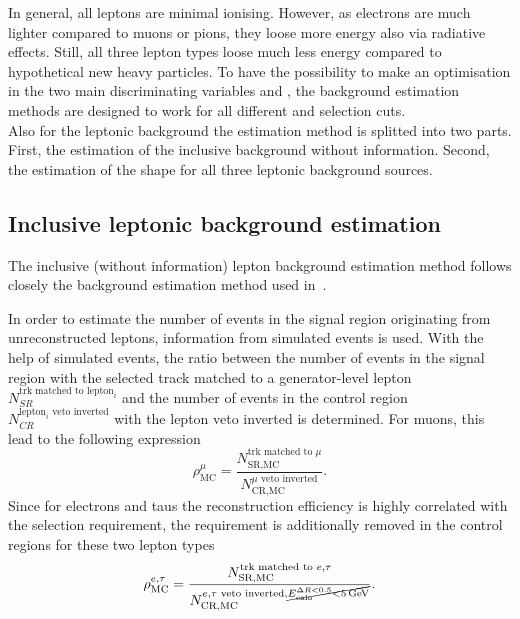 In general, all leptons are minimal ionising.
However, as electrons are much lighter compared to muons or pions, they loose more energy also via radiative effects.
Still, all three lepton types loose much less energy compared to hypothetical new heavy particles.
To have the possibility to make an optimisation in the two main discriminating variables \pt and \ias, the background estimation methods are designed to work for all different \pt and \ias selection cuts.\\





Also for the leptonic background the estimation method is splitted into two parts.
First, the estimation of the inclusive background without \ias information.
Second, the estimation of the \ias shape for all three leptonic background sources.


\subsection*{Inclusive leptonic background estimation}
The inclusive (without \ias information) lepton background estimation method follows closely the background estimation method used in~\cite{bib:CMS:DT_Thesis,bib:CMS:DT_8TeV_AN}.

In order to estimate the number of events in the signal region originating from unreconstructed leptons, information from simulated events is used.
With the help of simulated \WJets events, the ratio between the number of events in the signal region with the selected track matched to a generator-level lepton $N_{SR}^{\text{trk matched to lepton}_i}$
 and the number of events in the control region $N_{CR}^{\text{lepton}_i\text{ veto inverted}}$ with the lepton veto inverted is determined.
For muons, this lead to the following expression
\begin{equation*}
\rho_{\text{MC}}^{\mu} = \frac{N_{\text{SR,MC}}^{\text{trk matched to }\mu}}{N_{\text{CR,MC}}^{\mu \text{ veto inverted}}}.
\end{equation*}
Since for electrons and taus the reconstruction efficiency is highly correlated with the \ecalo selection requirement, the \ecalo requirement is additionally removed in the control regions for these two lepton types 
\begin{equation*}
\rho_{\text{MC}}^{e,\tau} = \frac{N_{\text{SR,MC}}^{\text{trk matched to }e,\tau}}{N_{\text{CR,MC}}^{e,\tau\text{ veto inverted}, \cancel{E^{\Delta R<0.5}_{\text{calo}}<5\,\text{Ge}\kern-0.06667em\text{V}}}}.
\end{equation*}

